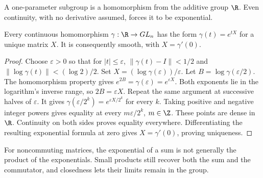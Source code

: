 A one-parameter subgroup is a homomorphism from the additive group $\R$.
Even continuity, with no derivative assumed, forces it to be exponential.

\begin{proposition}\label{prop:oneparameter}
Every continuous homomorphism $\gamma:\R\to GL_n$ has the form
$\gamma(t)=e^{tX}$ for a unique matrix $X$.
It is consequently smooth, with $X=\gamma'(0)$.
\end{proposition}
\begin{proof}
Choose $\varepsilon>0$ so that for $|t|\le\varepsilon$,
$\|\gamma(t)-I\|<1/2$ and $\|\log\gamma(t)\|<(\log2)/2$.
Set $X=(\log\gamma(\varepsilon))/\varepsilon$.
Let $B=\log\gamma(\varepsilon/2)$.
The homomorphism property gives
$e^{2B}=\gamma(\varepsilon)=e^{\varepsilon X}$.
Both exponents lie in the logarithm's inverse range, so $2B=\varepsilon X$.
Repeat the same argument at successive halves of $\varepsilon$.
It gives $\gamma(\varepsilon/2^k)=e^{\varepsilon X/2^k}$ for every $k$.
Taking positive and negative integer powers gives equality at every
$m\varepsilon/2^k$, $m\in\Z$. These points are dense in $\R$.
Continuity on both sides proves equality everywhere.
Differentiating the resulting exponential formula at zero gives
$X=\gamma'(0)$, proving uniqueness.
\end{proof}

For noncommuting matrices, the exponential of a sum is not generally the
product of the exponentials. Small products still recover both the sum
and the commutator, and closedness lets their limits remain in the group.

